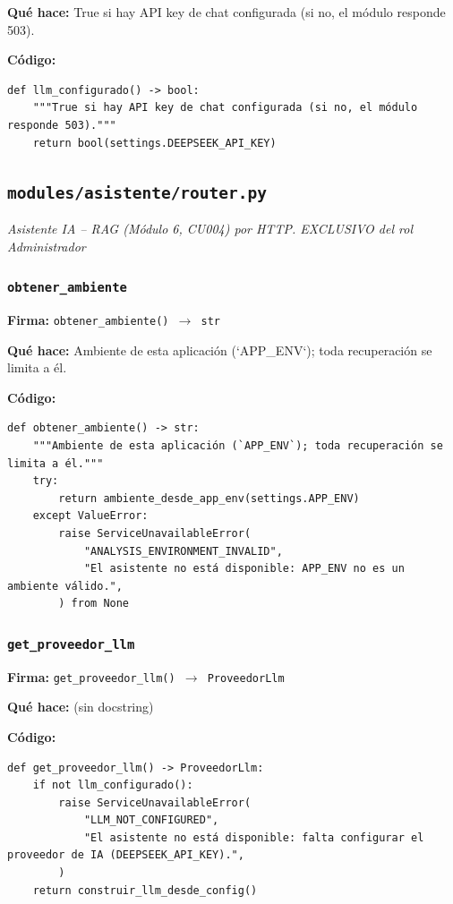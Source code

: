 \documentclass[11pt,a4paper]{article}
\begin{document}
\textbf{Qué hace:} True si hay API key de chat configurada (si no, el módulo responde 503).

\textbf{Código:}
\begin{lstlisting}
def llm_configurado() -> bool:
    """True si hay API key de chat configurada (si no, el módulo responde 503)."""
    return bool(settings.DEEPSEEK_API_KEY)
\end{lstlisting}

\subsection{\texttt{modules/asistente/router.py}}
\textit{Asistente IA -- RAG (Módulo 6, CU004) por HTTP. EXCLUSIVO del rol Administrador}

\subsubsection*{\texttt{obtener\_ambiente}}
\textbf{Firma:} \texttt{obtener\_ambiente() $\rightarrow$ str}

\textbf{Qué hace:} Ambiente de esta aplicación (`APP\_ENV`); toda recuperación se limita a él.

\textbf{Código:}
\begin{lstlisting}
def obtener_ambiente() -> str:
    """Ambiente de esta aplicación (`APP_ENV`); toda recuperación se limita a él."""
    try:
        return ambiente_desde_app_env(settings.APP_ENV)
    except ValueError:
        raise ServiceUnavailableError(
            "ANALYSIS_ENVIRONMENT_INVALID",
            "El asistente no está disponible: APP_ENV no es un ambiente válido.",
        ) from None
\end{lstlisting}

\subsubsection*{\texttt{get\_proveedor\_llm}}
\textbf{Firma:} \texttt{get\_proveedor\_llm() $\rightarrow$ ProveedorLlm}

\textbf{Qué hace:} (sin docstring)

\textbf{Código:}
\begin{lstlisting}
def get_proveedor_llm() -> ProveedorLlm:
    if not llm_configurado():
        raise ServiceUnavailableError(
            "LLM_NOT_CONFIGURED",
            "El asistente no está disponible: falta configurar el proveedor de IA (DEEPSEEK_API_KEY).",
        )
    return construir_llm_desde_config()
\end{lstlisting}
\end{document}
